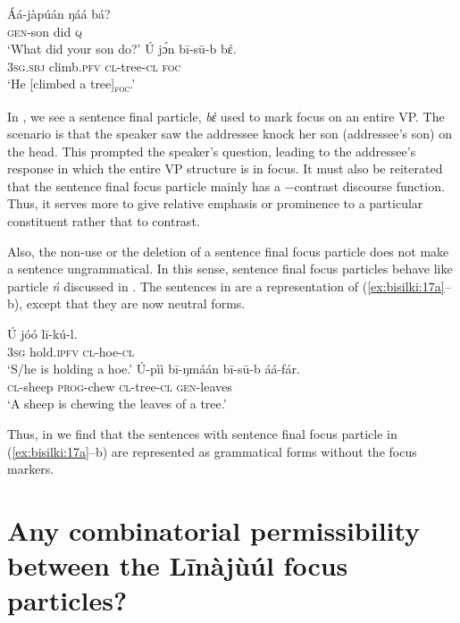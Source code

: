\documentclass[output=paper,colorlinks,citecolor=brown]{langscibook}
\begin{document}
\ea%
    \label{ex:bisilki:19}
    \ea\label{ex:bisilki:19a}
    \gll    Áá-jàpúán	ŋáá	bá?\\
            \textsc{gen-}son	did	\textsc{q}\\
    \glt    ‘What did your son do?’
    \ex\label{ex:bisilki:19b}
    \gll    Ú		jɔ́n		bī-sū-b	bέ.\\
            \textsc{3sg.sbj}	climb\textsc{.pfv}	\textsc{cl-}tree\textsc{-cl}	\textsc{foc}\\
    \glt    ‘He [climbed a tree]\textsubscript{\textsc{foc}}.’
    \z
\z

In , we see a sentence final particle, \textit{bέ} used to mark focus on an entire VP. The scenario is that the speaker  saw the addressee  knock her son (addressee’s son) on the head. This prompted the speaker’s question, leading to the addressee’s response  in which the entire VP structure is in focus. It must also be reiterated that the sentence final focus particle mainly has a −contrast discourse function. Thus, it serves more to give relative emphasis or prominence to a particular constituent rather that to contrast.

Also, the non-use or the deletion of a sentence final focus particle does not make a sentence ungrammatical. In this sense, sentence final focus particles behave like particle \textit{ń} discussed in . The sentences in  are a representation of (\ref{ex:bisilki:17a}--b), except that they are now neutral forms.

\ea%
    \label{ex:bisilki:20}
    \ea\label{ex:bisilki:20a}
    \gll    Ú	jóó		lī-kú-l.\\
            \textsc{3sg}	hold\textsc{.ipfv}	\textsc{cl-}hoe\textsc{-cl}\\
    \glt    ‘S/he is holding a hoe.’
    \ex\label{ex:bisilki:20b}
    \gll    Ú-pìì		bī-ŋmáán	bī-sū-b	áá-fár.\\
            \textsc{cl-}sheep	\textsc{prog-}chew	\textsc{cl-}tree\textsc{-cl}	\textsc{gen-}leaves\\
    \glt    ‘A sheep is chewing the leaves of a tree.’
    \z
\z

Thus, in  we find that the sentences with sentence final focus particle in (\ref{ex:bisilki:17a}--b) are represented as grammatical forms without the focus markers.

\section{Any combinatorial permissibility between the Līnàjùúl focus particles?}\label{sec:bisilki:6}
\end{document}

